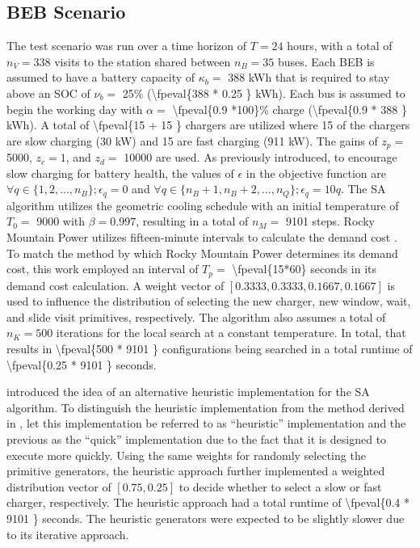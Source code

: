 \documentclass[ee,thesis]{usuthesis}
\newcommand{\A}{35 }                                                            %
\newcommand{\N}{338 }                                                           %
\newcommand{\Cgain}{5000}                                                       %
\newcommand{\acharge}{0.9 }                                                     %
\newcommand{\mincharge}{25\% }                                                  %
\newcommand{\minchargeD}{0.25 }                                                 %
\newcommand{\batsize}{388 }                                                     %
\newcommand{\fast}{15 }                                                         %
\newcommand{\slow}{15 }                                                         %
\newcommand{\fasts}{911 }                                                       %
\newcommand{\slows}{30 }                                                        %
\newcommand{\localcnt}{500 }                                                    %
\newcommand{\tempinit}{9000 }                                                   %
\newcommand{\tempcnt}{9101 }                                                    %
\newcommand{\quicklocal}{0.25 }                                                %
\newcommand{\heuristiclocal}{0.4 }                                             %
\begin{document}
\subsection{BEB Scenario}
\label{sec:sa-beb-scenario}
The test scenario was run over a time horizon of \(T=24\) hours, with a total of \(n_V = \N\) visits to the station shared
between \(n_B = \A\) buses. Each BEB is assumed to have a battery capacity of \(\kappa_b =\) \batsize kWh that is required to
stay above an SOC of \(\nu_b =\) \mincharge (\num{\fpeval{\batsize * \minchargeD}} kWh). Each bus is assumed to
begin the working day with \(\alpha =\) \num{\fpeval{\acharge*100}}\% charge (\num{\fpeval{\acharge * \batsize}} kWh). A total of \num{\fpeval{\fast + \slow}} chargers are utilized where \slow of the chargers
are slow charging (\slows kW) and \fast are fast charging (\fasts kW). The gains of \(z_p =\) \num{\Cgain},
\(z_c = 1\), and \(z_d =\) \num{10000} are used. As previously introduced, to encourage slow charging for battery
health, the values of \(\epsilon\) in the objective function are \(\forall q \in \{1,2,..., n_B \}; \epsilon_q = 0\) and \(\forall q \in \{n_B + 1, n_B +
2, ..., n_Q\}; \epsilon_q = 10q\). The SA algorithm utilizes the geometric cooling schedule with an initial temperature of \(T_0
=\) \num{\tempinit} with \(\beta = 0.997\), resulting in a total of \(n_M =\) \num{\tempcnt} steps. Rocky
Mountain Power utilizes fifteen-minute intervals to calculate the demand cost \cite{rocky-mountain-power}. To match the
method by which Rocky Mountain Power determines its demand cost, this work employed an interval of \(T_p =\)
\num{\fpeval{15*60}} seconds in its demand cost calculation. A weight vector of \([0.3333, 0.3333, 0.1667,
0.1667]\) is used to influence the distribution of selecting the new charger, new window, wait, and slide visit
primitives, respectively. The algorithm also assumes a total of \(n_K = \localcnt\) iterations for the local search at a
constant temperature. In total, that results in \num{\fpeval{\localcnt * \tempcnt}} configurations being
searched in a total runtime of \num{\fpeval{\quicklocal * \tempcnt}} seconds.

introduced the idea of an alternative heuristic implementation for the SA algorithm. To
distinguish the heuristic implementation from the method derived in , let this
implementation be referred to as ``heuristic'' implementation and the previous as the ``quick'' implementation due to the
fact that it is designed to execute more quickly. Using the same weights for randomly selecting the primitive
generators, the heuristic approach further implemented a weighted distribution vector of \([0.75, 0.25]\) to decide
whether to select a slow or fast charger, respectively. The heuristic approach had a total runtime of
\num{\fpeval{\heuristiclocal * \tempcnt}} seconds. The heuristic generators were expected to be slightly
slower due to its iterative approach.
\end{document}
